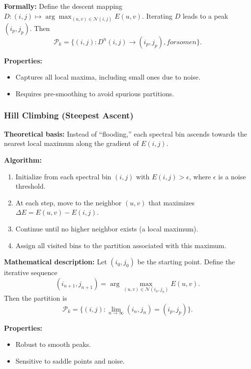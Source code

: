 \documentclass[journal,10pt,twocolumn]{IEEEtran}
\def\text#1{#1}%
\def\;{ }%
\begin{document}
    \textbf{Formally:} Define the descent mapping $D:(i,j) \mapsto \arg\max_{(u,v) \in \mathcal{N}(i,j)} E(u,v)$. Iterating $D$ leads to a peak $(i_p,j_p)$. Then
    \[
        \mathcal{P}_k = \{ (i,j) : D^n(i,j) \to (i_p,j_p), \; \text{for some } n \}.
    \]

    \textbf{Properties:}
    \begin{itemize}[leftmargin=1.4em]
        \item Captures all local maxima, including small ones due to noise.
        \item Requires pre-smoothing to avoid spurious partitions.
    \end{itemize}

    \subsubsection{Hill Climbing (Steepest Ascent)}
    \textbf{Theoretical basis:} Instead of ``flooding,'' each spectral bin ascends towards the nearest local maximum along the gradient of $E(i,j)$.

    \textbf{Algorithm:}
    \begin{enumerate}[leftmargin=1.5em]
        \item Initialize from each spectral bin $(i,j)$ with $E(i,j) > \epsilon$, where $\epsilon$ is a noise threshold.
        \item At each step, move to the neighbor $(u,v)$ that maximizes $\Delta E = E(u,v) - E(i,j)$.
        \item Continue until no higher neighbor exists (a local maximum).
        \item Assign all visited bins to the partition associated with this maximum.
    \end{enumerate}

    \textbf{Mathematical description:} Let $(i_0,j_0)$ be the starting point. Define the iterative sequence
    \[
        (i_{n+1}, j_{n+1}) = \arg\max_{(u,v)\in\mathcal{N}(i_n,j_n)} E(u,v).
    \]
    Then the partition is
    \[
        \mathcal{P}_k = \{ (i,j): \lim_{n \to \infty} (i_n,j_n) = (i_p,j_p) \}.
    \]

    \textbf{Properties:}
    \begin{itemize}[leftmargin=1.4em]
        \item Robust to smooth peaks.
        \item Sensitive to saddle points and noise.
    \end{itemize}
\end{document}
